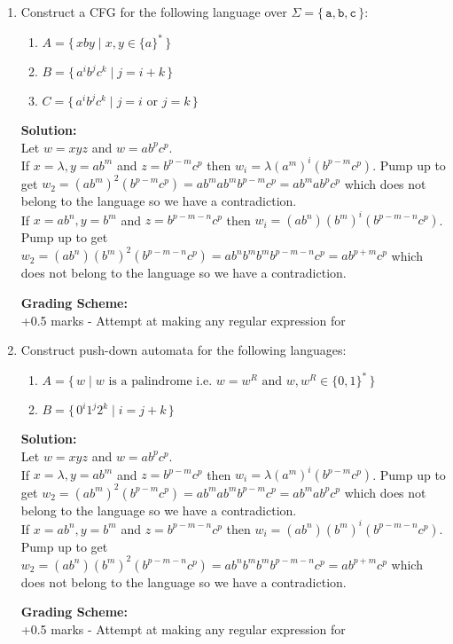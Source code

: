 \documentclass[11pt, article, oneside]{memoir}
\newcommand{\set}[1]{\{\, #1\, \}}
\begin{document}
\begin{enumerate}
    \item
        Construct a CFG for the following language over \(\Sigma = \set{\texttt{a}, \texttt{b}, \texttt{c}}\):
        \begin{enumerate}
            \item
                \(A = \set{xby \mid x, y \in \{a\}^*}\) 
            \item
                \(B = \set{ {a^i}{b^j}{c^k} \mid j = i + k}\)
            \item
                \(C = \set{ {a^i}{b^j}{c^k} \mid j = i \text{ or } j = k}\)
        \end{enumerate}
                
        \textbf{Solution:}
        \\Let \(w = xyz\) and \(w = ab^pc^p\).
        \\If \(x = \lambda, y = ab^m\) and \(z = b^{p - m}c^p\) then \(w_i = \lambda(a^m)^i(b^{p - m}c^p)\). Pump up to get \(w_2 = (ab^m)^2(b^{p - m}c^p) = ab^mab^mb^{p - m}c^p = ab^mab^pc^p\) which does not belong to the language so we have a contradiction.
        \\If \(x = ab^n, y = b^m\) and \(z = b^{p - m - n}c^p\) then \(w_i = (ab^n)(b^m)^i(b^{p - m - n}c^p)\). Pump up to get \(w_2 = (ab^n)(b^m)^2(b^{p - m - n}c^p) = ab^nb^mb^mb^{p - m - n}c^p = ab^{p + m}c^p\) which does not belong to the language so we have a contradiction.

        \textbf{Grading Scheme:}
        \\+0.5 marks - Attempt at making any regular expression for
        
    \item
        Construct push-down automata for the following languages:
        \begin{enumerate}
            \item
                \(A = \set{w \mid w \text{ is a palindrome i.e. } w = w^R \text{ and } w, w^R \in \{0, 1\}^*}\) 
            \item
                \(B = \set{ {0^i}{1^j}{2^k} \mid i = j + k}\)
        \end{enumerate}

        \textbf{Solution:}
        \\Let \(w = xyz\) and \(w = ab^pc^p\).
        \\If \(x = \lambda, y = ab^m\) and \(z = b^{p - m}c^p\) then \(w_i = \lambda(a^m)^i(b^{p - m}c^p)\). Pump up to get \(w_2 = (ab^m)^2(b^{p - m}c^p) = ab^mab^mb^{p - m}c^p = ab^mab^pc^p\) which does not belong to the language so we have a contradiction.
        \\If \(x = ab^n, y = b^m\) and \(z = b^{p - m - n}c^p\) then \(w_i = (ab^n)(b^m)^i(b^{p - m - n}c^p)\). Pump up to get \(w_2 = (ab^n)(b^m)^2(b^{p - m - n}c^p) = ab^nb^mb^mb^{p - m - n}c^p = ab^{p + m}c^p\) which does not belong to the language so we have a contradiction.

        \textbf{Grading Scheme:}
        \\+0.5 marks - Attempt at making any regular expression for
        
\end{enumerate}
\end{document}
